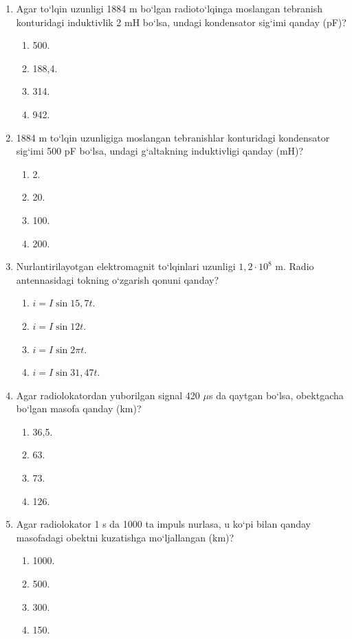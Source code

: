\begin{enumerate}
\item Agar to‘lqin uzunligi 1884 m bo‘lgan radioto‘lqinga moslangan tebranish konturidagi induktivlik 2 mH bo‘lsa, undagi kondensator sig‘imi qanday (pF)?
\begin{enumerate}[label=\Alph*)]
\item 500.
\item 188,4.
\item 314.
\item 942.
\end{enumerate}

\item 1884 m to‘lqin uzunligiga moslangan tebranishlar konturidagi kondensator sig‘imi 500 pF bo‘lsa, undagi g‘altakning induktivligi qanday (mH)?
\begin{enumerate}[label=\Alph*)]
\item 2.
\item 20.
\item 100.
\item 200.
\end{enumerate}

\item Nurlantirilayotgan elektromagnit to‘lqinlari uzunligi $1,2\cdot 10^8$ m. Radio antennasidagi tokning o‘zgarish qonuni qanday?
\begin{enumerate}[label=\Alph*)]
\item $i = I\sin 15,7t$.
\item $i = I\sin 12t$.
\item $i = I\sin 2\pi t$.
\item $i = I\sin 31,47t$.
\end{enumerate}

\setcounter{enumi}{13}
\item Agar radiolokatordan yuborilgan signal 420 $\mu$s da qaytgan bo‘lsa, obektgacha bo‘lgan masofa qanday (km)?
\begin{enumerate}[label=\Alph*)]
\item 36,5.
\item 63.
\item 73.
\item 126.
\end{enumerate}

\item Agar radiolokator 1 s da 1000 ta impuls nurlasa, u ko‘pi bilan qanday masofadagi obektni kuzatishga mo‘ljallangan (km)?


\begin{enumerate}[label=\Alph*)]
\item 1000.
\item 500.
\item 300.
\item 150.
\end{enumerate}


\end{enumerate}
